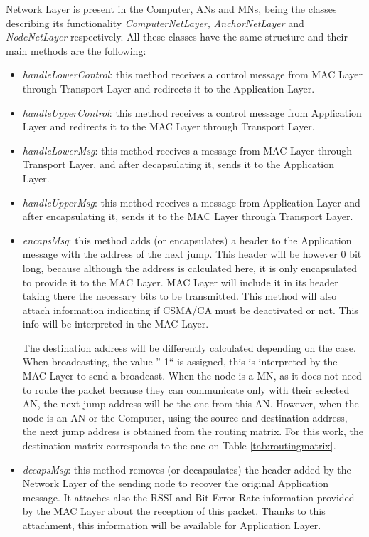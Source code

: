Network Layer is present in the Computer, \acp{AN} and \acp{MN}, being the classes describing its functionality \textit{ComputerNetLayer},
\textit{AnchorNetLayer} and \textit{NodeNetLayer} respectively. All these classes have the same structure and their main methods are the following:
\begin{itemize}
 \item \textit{handleLowerControl}: this method receives a control message from \ac{MAC} Layer through Transport Layer and redirects it to the
Application Layer.
 \item \textit{handleUpperControl}: this method receives a control message from Application Layer and redirects it to the \ac{MAC} Layer through
Transport Layer.
 \item \textit{handleLowerMsg}: this method receives a message from \ac{MAC} Layer through Transport Layer, and after decapsulating it, sends it
to the Application Layer.
 \item \textit{handleUpperMsg}: this method receives a message from Application Layer and after encapsulating it, sends it to the \ac{MAC}
Layer through Transport Layer.
 \item \textit{encapsMsg}: this method adds (or encapsulates) a header to the Application message with the address of the next jump. This 
header will be however 0 bit long, because although the address is calculated here, it is only encapsulated to provide it to the \ac{MAC} Layer.
\ac{MAC} Layer will include it in its header taking there the necessary bits to be transmitted. This method will also attach information 
indicating if \ac{CSMA/CA} must be deactivated or not. This info will be interpreted in the \ac{MAC} Layer.

The destination address will be differently calculated depending on the case. When broadcasting, the value ''-1`` is assigned, this is 
interpreted by the \ac{MAC} Layer to send a broadcast. When the node is a \ac{MN}, as it does not need to route the packet because they 
can communicate only with their selected \ac{AN}, the next jump address will be the one from this \ac{AN}. However, when the node is an \ac{AN}
or the Computer, using the source and destination address, the next jump address is obtained from the routing matrix. For this work, the 
destination matrix corresponds to the one on Table \ref{tab:routingmatrix}.
 \item \textit{decapsMsg}: this method removes (or decapsulates) the header added by the Network Layer of the sending node to recover the 
original Application message. It attaches also the \ac{RSSI} and Bit Error Rate information provided by the \ac{MAC} Layer about the 
reception of this packet. Thanks to this attachment, this information will be available for Application Layer.
\end{itemize}

